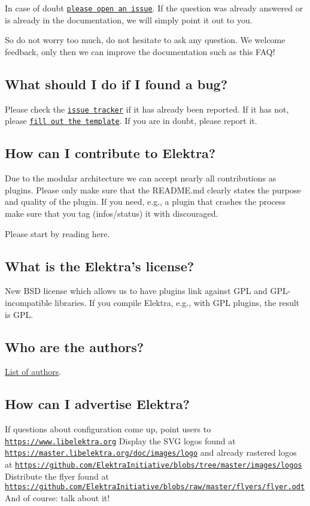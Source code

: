 In case of doubt \href{https://git.libelektra.org/issues}{\tt please open an issue}. If the question was already answered or is already in the documentation, we will simply point it out to you.

So do not worry too much, do not hesitate to ask any question. We welcome feedback, only then we can improve the documentation such as this F\+A\+Q!

\subsection*{What should I do if I found a bug?}

Please check the \href{https://git.libelektra.org/issues}{\tt issue tracker} if it has already been reported. If it has not, please \href{https://git.libelektra.org/issues/new}{\tt fill out the template}. If you are in doubt, please report it.

\subsection*{How can I contribute to Elektra?}

Due to the modular architecture we can accept nearly all contributions as plugins. Please only make sure that the R\+E\+A\+D\+M\+E.\+md clearly states the purpose and quality of the plugin. If you need, e.\+g., a plugin that crashes the process make sure that you tag ({\ttfamily infos/status}) it with {\ttfamily discouraged}.

Please start by reading here.

\subsection*{What is the Elektra’s license?}

New B\+SD license which allows us to have plugins link against G\+PL and G\+P\+L-\/incompatible libraries. If you compile Elektra, e.\+g., with G\+PL plugins, the result is G\+PL.

\subsection*{Who are the authors?}

\hyperlink{doc_AUTHORS_md}{List of authors}.

\subsection*{How can I advertise Elektra?}

If questions about configuration come up, point users to \href{https://www.libelektra.org}{\tt https\+://www.\+libelektra.\+org} Display the S\+VG logos found at \href{https://master.libelektra.org/doc/images/logo}{\tt https\+://master.\+libelektra.\+org/doc/images/logo} and already rastered logos at \href{https://github.com/ElektraInitiative/blobs/tree/master/images/logos}{\tt https\+://github.\+com/\+Elektra\+Initiative/blobs/tree/master/images/logos} Distribute the flyer found at \href{https://github.com/ElektraInitiative/blobs/raw/master/flyers/flyer.odt}{\tt https\+://github.\+com/\+Elektra\+Initiative/blobs/raw/master/flyers/flyer.\+odt} And of course\+: talk about it! 
